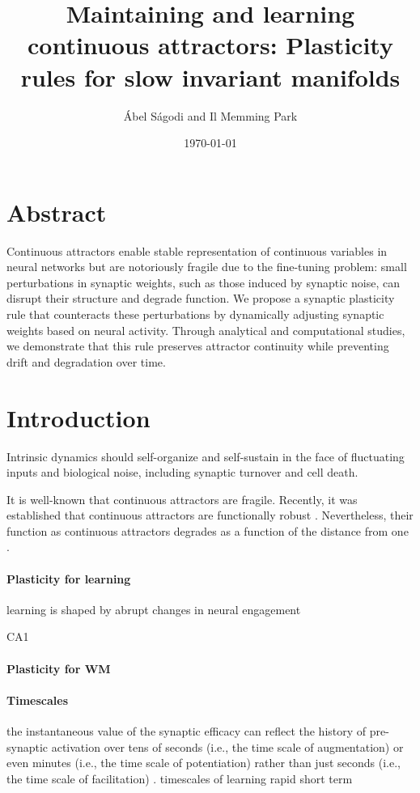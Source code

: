 \documentclass{article}
\title{Maintaining and learning continuous attractors: Plasticity rules for slow invariant manifolds} %
\author{\'Abel S\'agodi and Il Memming Park}
\date{\today}
\theoremstyle{definition} \newtheorem{definition}{Definition}
\theoremstyle{remark} \newtheorem{remark}{Remark}
\newcounter{ct}
\begin{document}
\maketitle

\section*{Abstract}
Continuous attractors enable stable representation of continuous variables in neural networks but are notoriously fragile due to the fine-tuning problem: small perturbations in synaptic weights, such as those induced by synaptic noise, can disrupt their structure and degrade function.
We propose a synaptic plasticity rule that counteracts these perturbations by dynamically adjusting synaptic weights based on neural activity.
Through analytical and computational studies, we demonstrate that this rule preserves attractor continuity while preventing drift and degradation over time.




\section{Introduction}


Intrinsic dynamics should self-organize and self-sustain in the face of fluctuating inputs and biological noise, including synaptic turnover and cell death.

It is well-known that continuous attractors are fragile. 
Recently, it was established that continuous attractors are functionally robust \citep{Sagodi2024a}.
Nevertheless, their function as continuous attractors degrades as a function of the distance from one \citep{Sagodi2024a}.



\paragraph{Plasticity for learning}
learning is shaped by abrupt changes in neural engagement \citep{hennig2021learning}

CA1 \citep{bittner2017behavioral} 

\paragraph{Plasticity for WM}
\citep{kilpatrick2018wm}

\paragraph{Timescales}
the instantaneous value of the synaptic efficacy can reflect the history of pre-synaptic activation over tens of seconds (i.e., the time scale of augmentation) or even minutes (i.e., the time scale of potentiation) rather than just seconds (i.e., the time scale of facilitation)  \citep{thomson2000facilitation}.
timescales of learning\citep{miller2024timescales}
rapid \citep{li2023rapid} \citep{dan2024neural} 
short term \citep{fioravante2011short}
\citep{brennan2023attractor}
\end{document}
